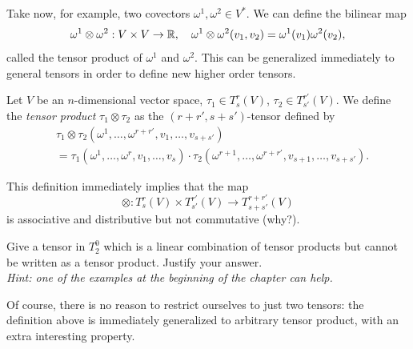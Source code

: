 Take now, for example, two covectors $\omega^1, \omega^2 \in V^*$. We can define the bilinear map
\begin{equation}
	\omega^1\otimes \omega^2 : V\times V \to \mathbb{R},\quad
	\omega^1\otimes \omega^2(v_1, v_2) = \omega^1(v_1)\omega^2(v_2),
\end{equation}
called the tensor product of $\omega^1$ and $\omega^2$.
This can be generalized immediately to general tensors in order to define new higher order tensors.

\begin{definition}
	Let $V$ be an $n$-dimensional vector space, $\tau_1\in T_s^r(V)$, $\tau_2\in T_{s'}^{r'}(V)$.
	We define the \emph{tensor product} $\tau_1\otimes\tau_2$ as the $(r+r', s+s')$-tensor defined by
	\begin{align}
		 & \tau_1\otimes\tau_2(\omega^1,\ldots,\omega^{r+r'}, v_1,\ldots,v_{s+s'})                                                          \\
		 & = \tau_1(\omega^1,\ldots,\omega^{r}, v_1,\ldots,v_{s}) \cdot \tau_2(\omega^{r+1},\ldots,\omega^{r+r'}, v_{s+1},\ldots,v_{s+s'}).
	\end{align}
\end{definition}

This definition immediately implies that the map
\begin{equation}
	\otimes :  T_s^r(V)\times T_{s'}^{r'}(V) \to T_{s+s'}^{r+r'}(V)
\end{equation}
is associative and distributive but not commutative (why?).

\begin{exercise}
	Give a tensor in $T^0_2$ which is a linear combination of tensor products but cannot be written as a tensor product.
	Justify your answer.\\
	\textit{\small Hint: one of the examples at the beginning of the chapter can help.}
\end{exercise}

Of course, there is no reason to restrict ourselves to just two tensors: the definition above is immediately generalized to arbitrary tensor product, with an extra interesting property.

